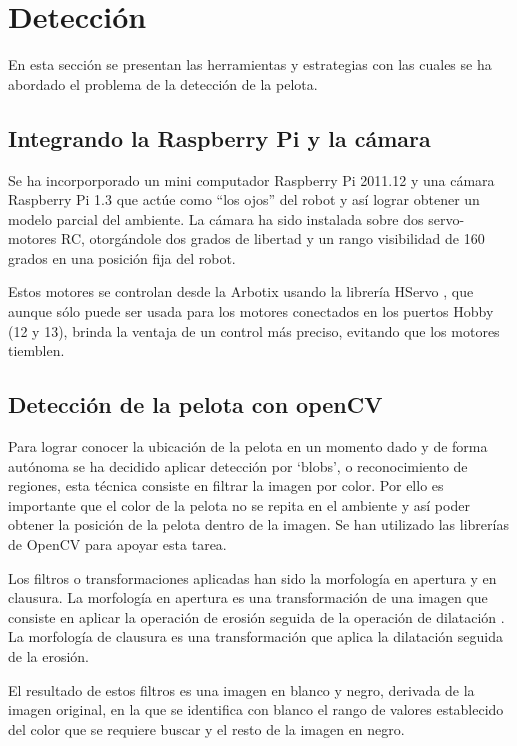 \documentclass[conference, letterpaper]{IEEEtranMC1}
\begin{document}
\section{Detección}
\label{sec:deteccion}


En esta sección se presentan las herramientas y estrategias con las cuales se ha abordado el problema de la detección de la pelota.

\subsection{Integrando la Raspberry Pi y la cámara}
Se ha incorporporado un mini computador Raspberry Pi 2011.12 y una cámara Raspberry Pi 1.3 que actúe como “los ojos” del robot y así lograr obtener un modelo parcial del ambiente. La cámara ha sido instalada sobre dos servo-motores RC, otorgándole dos grados de libertad y un rango visibilidad de 160 grados en una posición fija del robot.

Estos motores se controlan desde la Arbotix usando la librería HServo \cite{vanadium}, que aunque sólo puede ser usada para los motores conectados en los puertos Hobby (12 y 13), brinda la ventaja de un control más preciso, evitando que los motores tiemblen. 
 

\subsection{Detección de la pelota con openCV}
Para lograr conocer la ubicación de la pelota en un momento dado y de forma autónoma se ha decidido aplicar detección por ‘blobs’, o reconocimiento de regiones, esta técnica consiste en filtrar la imagen por color. Por ello es importante que el color de la pelota no se repita en el ambiente y así poder obtener la posición de la pelota dentro de la imagen. Se han utilizado las librerías de OpenCV para apoyar esta tarea.

Los filtros o transformaciones aplicadas han sido la morfología en apertura y en clausura. La morfología en apertura es una transformación de una imagen que consiste en aplicar la operación de erosión seguida de la operación de dilatación \cite{filtros}. La morfología de clausura es una transformación que aplica la dilatación seguida de la erosión.


El resultado de estos filtros es una imagen en blanco y negro, derivada de la imagen original, en la que se identifica con blanco el rango de valores establecido del color que se requiere buscar y el resto de la imagen en negro. 
\end{document}
